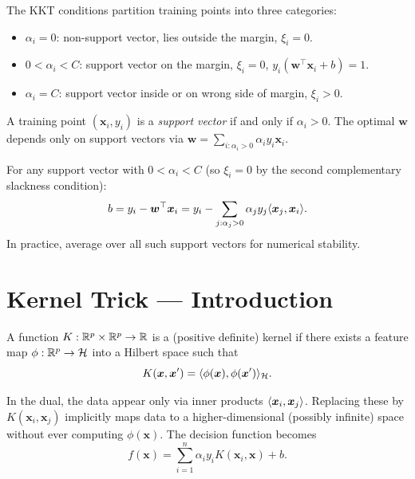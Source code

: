 \begin{proposition}
The KKT conditions partition training points into three categories:
\begin{itemize}
    \item $\alpha_i = 0$: non-support vector, lies outside the margin, $\xi_i = 0$.
    \item $0 < \alpha_i < C$: support vector on the margin, $\xi_i = 0$, $y_i(\bm{w}^\top\bm{x}_i+b) = 1$.
    \item $\alpha_i = C$: support vector inside or on wrong side of margin, $\xi_i > 0$.
\end{itemize}
\end{proposition}

\begin{proposition}
A training point $(\bm{x}_i, y_i)$ is a \emph{support vector} if and only if $\alpha_i > 0$. The optimal $\bm{w}$ depends only on support vectors via $\bm{w} = \sum_{i:\alpha_i>0}\alpha_i y_i\bm{x}_i$.
\end{proposition}

\begin{proposition}[Recovery of $b$]
For any support vector with $0 < \alpha_i < C$ (so $\xi_i = 0$ by the second complementary slackness condition):
\[
    b = y_i - \bm{w}^\top\bm{x}_i = y_i - \sum_{j:\alpha_j>0}\alpha_j y_j\langle \bm{x}_j, \bm{x}_i \rangle.
\]
In practice, average over all such support vectors for numerical stability.
\end{proposition}

\section{Kernel Trick --- Introduction}

\begin{definition}
A function $K : \mathbb{R}^p \times \mathbb{R}^p \to \mathbb{R}$ is a (positive definite) kernel if there exists a feature map $\phi : \mathbb{R}^p \to \mathcal{H}$ into a Hilbert space such that
\[
    K(\bm{x}, \bm{x}') = \langle \phi(\bm{x}), \phi(\bm{x}') \rangle_{\mathcal{H}}.
\]
\end{definition}

\begin{theorem}
In the dual, the data appear only via inner products $\langle \bm{x}_i, \bm{x}_j \rangle$. Replacing these by $K(\bm{x}_i, \bm{x}_j)$ implicitly maps data to a higher-dimensional (possibly infinite) space without ever computing $\phi(\bm{x})$. The decision function becomes
\[
    f(\bm{x}) = \sum_{i=1}^{n}\alpha_i y_i K(\bm{x}_i, \bm{x}) + b.
\]
\end{theorem}

